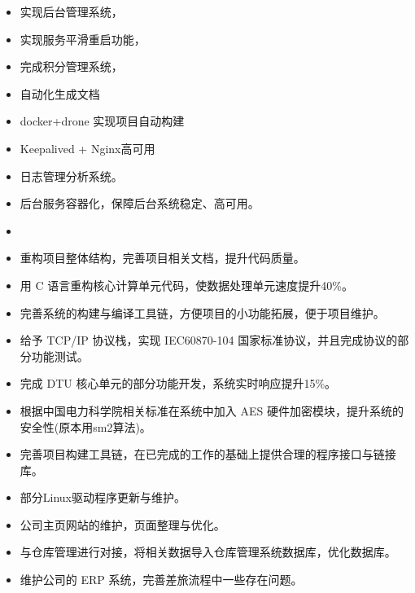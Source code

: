 \documentclass{resume}
\begin{document}
{\vspace{0.5ex}
\begin{itemize}
  \item 实现后台管理系统，
  \item 实现服务平滑重启功能，
  \item 完成积分管理系统， 
  \item 自动化生成文档
  \item docker+drone 实现项目自动构建
  \item Keepalived + Nginx高可用
  \item 日志管理分析系统。
  \item 后台服务容器化，保障后台系统稳定、高可用。
  \item 
\end{itemize}

\vspace{-0.5ex}
\begin{itemize}
  \item 重构项目整体结构，完善项目相关文档，提升代码质量。
  \item 用 C 语言重构核心计算单元代码，使数据处理单元速度提升40\%。
  \item 完善系统的构建与编译工具链，方便项目的小功能拓展，便于项目维护。
\end{itemize}

\vspace{-0.5ex}
\begin{itemize}
  \item 给予 TCP/IP 协议栈，实现 IEC60870-104 国家标准协议，并且完成协议的部分功能测试。
  \item 完成 DTU 核心单元的部分功能开发，系统实时响应提升15\%。
  \item 根据中国电力科学院相关标准在系统中加入 AES 硬件加密模块，提升系统的安全性(原本用sm2算法)。
  \item 完善项目构建工具链，在已完成的工作的基础上提供合理的程序接口与链接库。
  \item 部分Linux驱动程序更新与维护。
\end{itemize}

\vspace{-0.5ex}
\begin{itemize}
  \item 公司主页网站的维护，页面整理与优化。
  \item 与仓库管理进行对接，将相关数据导入仓库管理系统数据库，优化数据库。
  \item 维护公司的 ERP 系统，完善差旅流程中一些存在问题。
\end{itemize}

}
\end{document}
